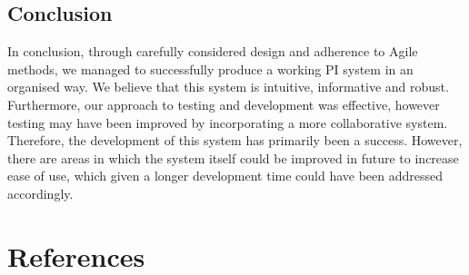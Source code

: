 \documentclass[12pt]{article}
\begin{document}
\subsection{Conclusion}
In conclusion, through carefully considered design and adherence to Agile 
methods, we managed to successfully produce a working PI system in an 
organised way. We believe that this system is intuitive, informative and 
robust. Furthermore, our approach to testing and development was 
effective, however testing may have been improved by incorporating a more collaborative system. Therefore, the development of this system has primarily been a 
success. However, there are areas in which the system itself could be 
improved in future to increase ease of use, which given a longer development time could have been addressed accordingly.\par

\newpage
\section{References}
\end{document}
